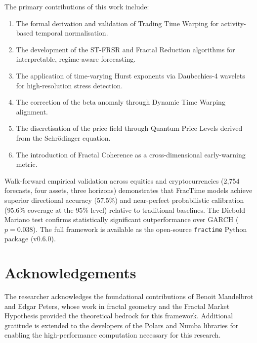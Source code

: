 \documentclass[12pt,a4paper]{article}
\begin{document}
The primary contributions of this work include:
\begin{enumerate}
  \item The formal derivation and validation of Trading Time Warping for
        activity-based temporal normalisation.
  \item The development of the ST-FRSR and Fractal Reduction algorithms for
        interpretable, regime-aware forecasting.
  \item The application of time-varying Hurst exponents via Daubechies-4
        wavelets for high-resolution stress detection.
  \item The correction of the beta anomaly through Dynamic Time Warping
        alignment.
  \item The discretisation of the price field through Quantum Price Levels
        derived from the Schr\"{o}dinger equation.
  \item The introduction of Fractal Coherence as a cross-dimensional
        early-warning metric.
\end{enumerate}

Walk-forward empirical validation across equities and cryptocurrencies
(2,754 forecasts, four assets, three horizons) demonstrates that FracTime
models achieve superior directional accuracy (57.5\%) and near-perfect
probabilistic calibration (95.6\% coverage at the 95\% level) relative to
traditional baselines.  The Diebold--Mariano test confirms statistically
significant outperformance over GARCH ($p = 0.038$).  The full framework
is available as the open-source \texttt{fractime} Python package (v0.6.0).

\section*{Acknowledgements}

The researcher acknowledges the foundational contributions of Benoit
Mandelbrot and Edgar Peters, whose work in fractal geometry and the Fractal
Market Hypothesis provided the theoretical bedrock for this framework.
Additional gratitude is extended to the developers of the Polars and Numba
libraries for enabling the high-performance computation necessary for this
research.


\end{document}
